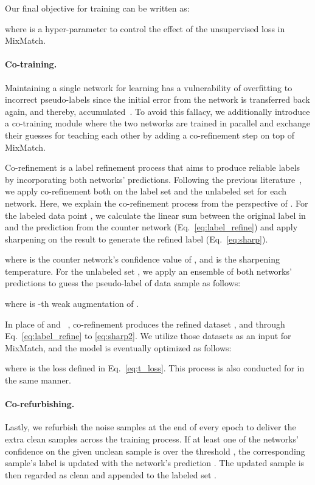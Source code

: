 \documentclass[final]{cvpr}
\newcommand{\cutparagraphup}{\vspace*{-0.15in}}
\begin{document}
Our final objective for training can be written as:

where  is a hyper-parameter to control the effect of the unsupervised loss in MixMatch.

\cutparagraphup 
\paragraph{Co-training.} 
Maintaining a single network for learning has a vulnerability of overfitting to incorrect pseudo-labels since the initial error from the network is transferred back again, and thereby, accumulated~\cite{han2018co}. To avoid this fallacy, we additionally introduce a co-training module where the two networks  are trained in parallel and exchange their guesses for teaching each other by adding a co-refinement step on top of MixMatch. 

Co-refinement is a label refinement process that aims to produce reliable labels by incorporating both networks' predictions. Following the previous literature~\cite{li2020dividemix}, we apply co-refinement both on the label set  and the unlabeled set  for each network. Here, we explain the co-refinement process from the perspective of . 
For the labeled data point , we calculate the linear sum between the original label  in  and the prediction from the counter network  (Eq.~\eqref{eq:label_refine}) and apply sharpening on the result to generate the refined label  (Eq.~\eqref{eq:sharp}).
 
where  is the counter network's confidence value of , and  is the sharpening temperature. For the unlabeled set , we apply an ensemble of both networks' predictions to guess the pseudo-label  of data sample  as follows:

where  is -th weak augmentation of .

In place of  and ~, co-refinement produces the refined dataset 
, and  through Eq.~\eqref{eq:label_refine} to \eqref{eq:sharp2}. We utilize those datasets as an input for MixMatch, and the model is eventually optimized as follows: 

where  is the loss defined in Eq.~\eqref{eq:t_loss}. 
This process is also conducted for  in the same manner. 

\cutparagraphup
\paragraph{Co-refurbishing.}
Lastly, we refurbish the noise samples at the end of every epoch to deliver the extra clean samples across the training process. 
If at least one of the networks' confidence on the given unclean sample  is over the threshold , the corresponding sample's label is updated with the network's prediction . The updated sample is then regarded as clean and appended to the labeled set .
\end{document}
